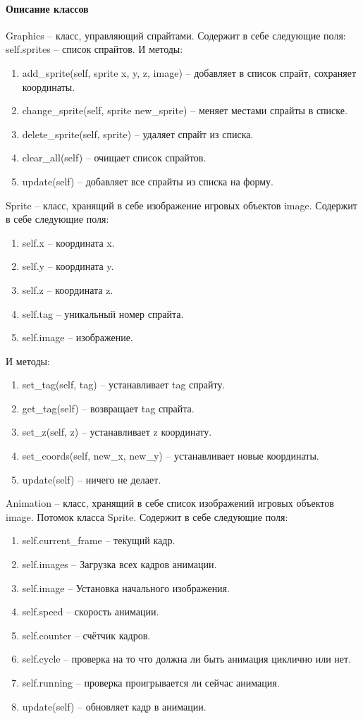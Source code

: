 \paragraph{Описание классов}
	Graphics -- класс, управляющий спрайтами. Содержит в себе следующие поля:
		self.sprites -- список спрайтов. И методы:
		\begin{enumerate}
			\item add\_sprite(self, sprite x, y, z, image) -- добавляет в список спрайт, сохраняет координаты.
			\item change\_sprite(self, sprite new\_sprite) -- меняет местами спрайты в списке.
			\item delete\_sprite(self, sprite) -- удаляет спрайт из списка.
			\item clear\_all(self) -- очищает список спрайтов.
			\item update(self) -- добавляет все спрайты из списка на форму.
		\end{enumerate}
	Sprite -- класс, хранящий в себе изображение игровых объектов image. Содержит в себе следующие поля:
		\begin{enumerate}
			\item self.x -- координата x.
			\item self.y -- координата y.
			\item self.z -- координата z.
			\item self.tag -- уникальный номер спрайта.
			\item self.image -- изображение.
		\end{enumerate}
		И методы:
		\begin{enumerate}
			\item set\_tag(self, tag) -- устанавливает tag спрайту.
			\item get\_tag(self) -- возвращает tag спрайта.
			\item set\_z(self, z) -- устанавливает z координату.
			\item set\_coords(self, new\_x, new\_y) -- устанавливает новые координаты.
			\item update(self) -- ничего не делает.
		\end{enumerate}
	Animation -- класс, хранящий в себе список изображений игровых объектов image. Потомок класса Sprite.  Содержит в себе следующие поля:
		\begin{enumerate}
			\item self.current\_frame -- текущий кадр.
			\item self.images  -- Загрузка всех кадров анимации.
			\item self.image -- Установка начального изображения.
			\item self.speed -- скорость анимации.
			\item self.counter -- счётчик кадров.
			\item self.cycle -- проверка на то что должна ли быть анимация циклично или нет.
			\item self.running -- проверка проигрывается ли сейчас анимация.
			\item update(self) -- обновляет кадр в анимации.
		\end{enumerate}

